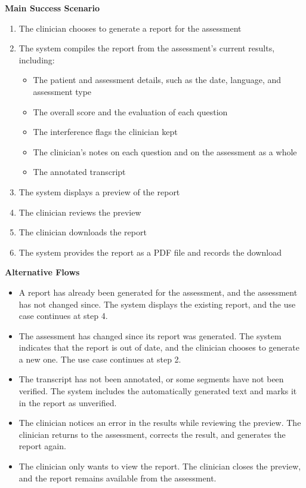 \documentclass[12pt]{article}
\begin{document}
\textbf{Main Success Scenario}
\begin{enumerate}
\item The clinician chooses to generate a report for the assessment
\item The system compiles the report from the assessment’s current results, including:
    \begin{itemize}
      \item The patient and assessment details, such as the date, language, and assessment type
      \item The overall score and the evaluation of each question
      \item The interference flags the clinician kept
      \item The clinician’s notes on each question and on the assessment as a whole
      \item The annotated transcript
    \end{itemize}
\item The system displays a preview of the report
\item The clinician reviews the preview
\item The clinician downloads the report
\item The system provides the report as a PDF file and records the download
\end{enumerate}

\textbf{Alternative Flows}
\begin{itemize}
\item[1a.] A report has already been generated for the assessment, and the assessment has not changed since. The system displays the existing report, and the use case continues at step 4.
\item[1b.] The assessment has changed since its report was generated. The system indicates that the report is out of date, and the clinician chooses to generate a new one. The use case continues at step 2.
\item[2a.] The transcript has not been annotated, or some segments have not been verified. The system includes the automatically generated text and marks it in the report as unverified.
\item[4a.] The clinician notices an error in the results while reviewing the preview. The clinician returns to the assessment, corrects the result, and generates the report again.
\item[5a.] The clinician only wants to view the report. The clinician closes the preview, and the report remains available from the assessment.
\end{itemize}
\end{document}
